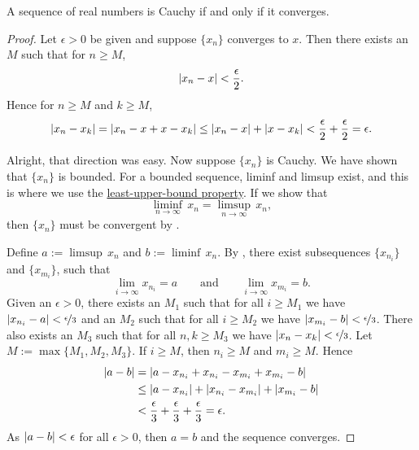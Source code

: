 \begin{thm}
A sequence of real numbers is Cauchy if and only if it converges.
\end{thm}

\begin{proof}
Let $\epsilon > 0$ be given and
suppose $\{ x_n \}$ converges to $x$.  Then there 
exists an $M$ such that for $n \geq M$,
\begin{equation*}
\left\lvert {x_n - x} \right\rvert < \frac{\epsilon}{2} .
\end{equation*}
Hence for $n \geq M$ and $k \geq M$,
\begin{equation*}
\left\lvert {x_n - x_k} \right\rvert = 
\left\lvert {x_n - x + x - x_k} \right\rvert
\leq \left\lvert {x_n-x} \right\rvert + \left\lvert {x-x_k} \right\rvert < \frac{\epsilon}{2} + \frac{\epsilon}{2} =
\epsilon .
\end{equation*}

Alright, that direction was easy.  Now suppose $\{ x_n \}$ is Cauchy.
We have shown that $\{ x_n \}$ is bounded.
For a bounded sequence, liminf and limsup exist, and this is
where we use the
\hyperref[defn:lub]{least-upper-bound property}.
If we show that
\begin{equation*}
\liminf_{n\to \infty} \, x_n = \limsup_{n\to\infty} \, x_n ,
\end{equation*}
then $\{ x_n \}$ must be convergent by .


Define $a := \limsup \, x_n$ and
$b := \liminf \, x_n$.
By , there exist subsequences
$\{ x_{n_i} \}$ and
$\{ x_{m_i} \}$, such that
\begin{equation*}
\lim_{i\to\infty} x_{n_i} = a
\qquad \text{and} \qquad
\lim_{i\to\infty} x_{m_i} = b.
\end{equation*}
Given an $\epsilon > 0$,
there exists an $M_1$ such that for all $i \geq M_1$
we have $\left\lvert {x_{n_i} - a} \right\rvert < \nicefrac{\epsilon}{3}$ and
an $M_2$ such that for all $i \geq M_2$ we have
$\left\lvert {x_{m_i} - b} \right\rvert < \nicefrac{\epsilon}{3}$.  There also exists an $M_3$
such that for all $n,k \geq M_3$ we have
$\left\lvert {x_n-x_k} \right\rvert < \nicefrac{\epsilon}{3}$.  Let $M := \max \{ M_1, M_2, M_3 \}$.
If $i \geq M$, then $n_i \geq M$ and $m_i \geq M$.  Hence
\begin{equation*}
\begin{split}
\left\lvert {a-b} \right\rvert & =
\left\lvert {a-x_{n_i}+x_{n_i}
-x_{m_i}+x_{m_i}
-b} \right\rvert \\
& \leq
\left\lvert {a-x_{n_i}} \right\rvert
+ \left\lvert {x_{n_i} -x_{m_i}} \right\rvert
+ \left\lvert {x_{m_i} -b} \right\rvert \\
& <
\frac{\epsilon}{3}
+
\frac{\epsilon}{3}
+
\frac{\epsilon}{3}
= \epsilon .
\end{split}
\end{equation*}
As $\left\lvert {a-b} \right\rvert < \epsilon$ for all $\epsilon > 0$, then $a=b$ and 
the sequence converges.
\end{proof}

